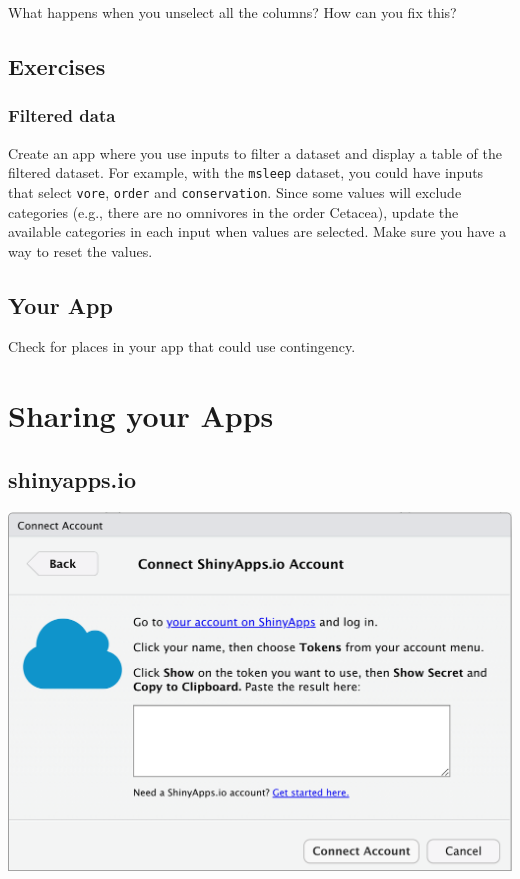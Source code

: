 \documentclass[
  oneside]{book}
\begin{document}
\begin{try}
What happens when you unselect all the columns? How can you fix this?

\end{try}

\hypertarget{exercises-contingency}{%
\section{Exercises}\label{exercises-contingency}}

\hypertarget{filtered-data}{%
\subsection{Filtered data}\label{filtered-data}}

Create an app where you use inputs to filter a dataset and display a table of the filtered dataset. For example, with the \texttt{msleep} dataset, you could have inputs that select \texttt{vore}, \texttt{order} and \texttt{conservation}. Since some values will exclude categories (e.g., there are no omnivores in the order Cetacea), update the available categories in each input when values are selected. Make sure you have a way to reset the values.

\hypertarget{your-app-contingency}{%
\section{Your App}\label{your-app-contingency}}

Check for places in your app that could use contingency.

\hypertarget{sharing}{%
\chapter{Sharing your Apps}\label{sharing}}

\hypertarget{shinyapps.io}{%
\section{shinyapps.io}\label{shinyapps.io}}

\includegraphics{images/saio_connect.png}
\end{document}
